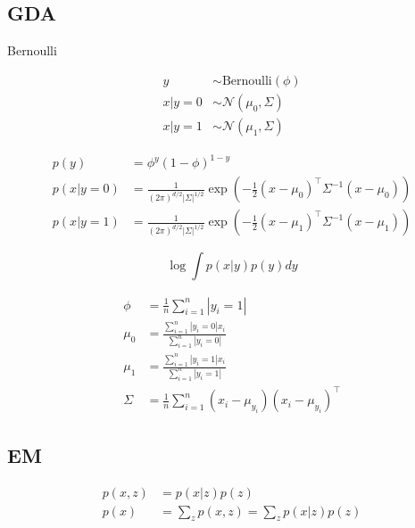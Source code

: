 	\subsection{GDA}
	
	Bernoulli

	\begin{align*}
		y&\sim \text{Bernoulli}(\phi)\\
		x|y=0&\sim\mathcal{N}(\mu_0,\Sigma)\\
		x|y=1&\sim\mathcal{N}(\mu_1,\Sigma)
	\end{align*}

	\begin{align*}
		p(y)&=\phi^y(1-\phi)^{1-y}\\
		p(x|y=0)&=\frac{1}{(2\pi)^{d/2}|\Sigma|^{1/2}}\exp\left(-\frac{1}{2}(x-\mu_0)^\top\Sigma^{-1}(x-\mu_0)\right)\\
		p(x|y=1)&=\frac{1}{(2\pi)^{d/2}|\Sigma|^{1/2}}\exp\left(-\frac{1}{2}(x-\mu_1)^\top\Sigma^{-1}(x-\mu_1)\right)
	\end{align*}

	\begin{equation}
		\log\int p(x|y)p(y)dy
	\end{equation}

	\begin{align*}
		\phi&=\frac{1}{n}\sum_{i=1}^n |y_i=1|\\
		\mu_0&=\frac{\sum_{i=1}^n|y_i=0|x_i}{\sum_{i=1}^n|y_i=0|}\\
		\mu_1&=\frac{\sum_{i=1}^n|y_i=1|x_i}{\sum_{i=1}^n|y_i=1|}\\
		\Sigma&=\frac{1}{n}\sum_{i=1}^n(x_i-\mu_{y_i})(x_i-\mu_{y_i})^\top
	\end{align*}

	\subsection{EM}
	\begin{align}
		p(x,z)&=p(x|z)p(z)\\
		p(x)&=\sum_z p(x,z)=\sum_z p(x|z)p(z)
	\end{align}
	
